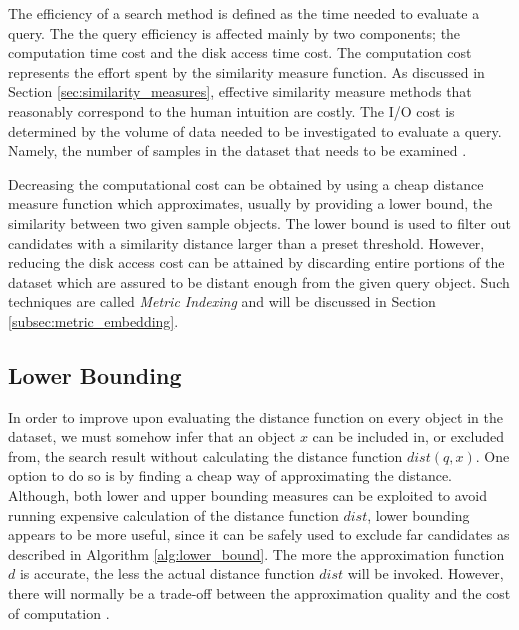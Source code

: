 \iftoggle{edit-mode}{\hspace{0pt}\marginpar{Problems - similarity search costs}}{}
The efficiency of a search method is defined as the time needed to evaluate a query. The the query efficiency is affected mainly by two components; the computation time cost and the disk access time cost. The computation cost represents the effort spent by the similarity measure function. As discussed in Section \ref{sec:similarity_measures}, effective similarity measure methods that reasonably correspond to the human intuition are costly. The I/O cost is determined by the volume of data needed to be investigated to evaluate a query. Namely, the number of samples in the dataset that needs to be examined \cite{saabni2013efficient}.

\iftoggle{edit-mode}{\hspace{0pt}\marginpar{Solution directions}}{}
Decreasing the computational cost can be obtained by using a cheap distance measure function which approximates, usually by providing a lower bound, the similarity between two given sample objects. The lower bound is used to filter out candidates with a similarity distance larger than a preset threshold. However, reducing the disk access cost can be attained by discarding entire portions of the dataset which are assured to be distant enough from the given query object. Such techniques are called \emph{Metric Indexing} and will be discussed in Section \ref{subsec:metric_embedding}.


\subsection{Lower Bounding}
\label{subsec:lower_bounding}
\iftoggle{edit-mode}{\hspace{0pt}\marginpar{Distance function approximation}}{}
In order to improve upon evaluating the distance function on every object in the dataset, we must somehow infer that an object $x$ can be included in, or excluded from, the search result without calculating the distance function $dist(q, x)$. One option to do so is by finding a cheap way of approximating the distance. Although, both lower and upper bounding measures can be exploited to avoid running expensive calculation of the distance function $dist$, lower bounding appears to be more useful, since it can be safely used to exclude far candidates as described in Algorithm \ref{alg:lower_bound}. The more the approximation function $d$ is accurate, the less the actual distance function $dist$ will be invoked. However, there will normally be a trade-off between the approximation quality and the cost of computation \cite{hetland2009basic, keogh2005exact}.

